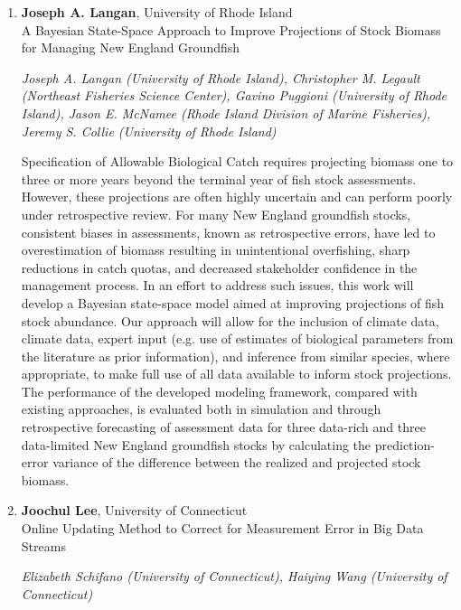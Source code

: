 \begin{enumerate}
\item \textbf{Joseph A. Langan}, University of Rhode Island \\
A Bayesian State-Space Approach to Improve Projections of Stock Biomass for Managing New England Groundfish

\emph{\footnotesize Joseph A. Langan (University of Rhode Island), Christopher M. Legault (Northeast Fisheries Science Center), Gavino Puggioni (University of Rhode Island), Jason E. McNamee (Rhode Island Division of Marine Fisheries), Jeremy S. Collie (University of Rhode Island)}

Specification of Allowable Biological Catch requires projecting biomass one to three or more years beyond the terminal year of fish stock assessments.  However, these projections are often highly uncertain and can perform poorly under retrospective review.  For many New England groundfish stocks, consistent biases in assessments, known as retrospective errors, have led to overestimation of biomass resulting in unintentional overfishing, sharp reductions in catch quotas, and decreased stakeholder confidence in the management process. In an effort to address such issues, this work will develop a Bayesian state-space model aimed at improving projections of fish stock abundance. Our approach will allow for the inclusion of climate data, climate data, expert input (e.g. use of estimates of biological parameters from the literature as prior information), and inference from similar species, where appropriate, to make full use of all data available to inform stock projections. The performance of the developed modeling framework, compared with existing approaches, is evaluated both in simulation and through retrospective forecasting of assessment data for three data-rich and three data-limited New England groundfish stocks by calculating the prediction-error variance of the difference between the realized and projected stock biomass.

\item \textbf{Joochul Lee}, University of Connecticut \\
Online Updating Method to Correct for Measurement Error in Big Data Streams

\emph{\footnotesize Elizabeth Schifano (University of Connecticut), Haiying Wang (University of Connecticut)}


\end{enumerate}
